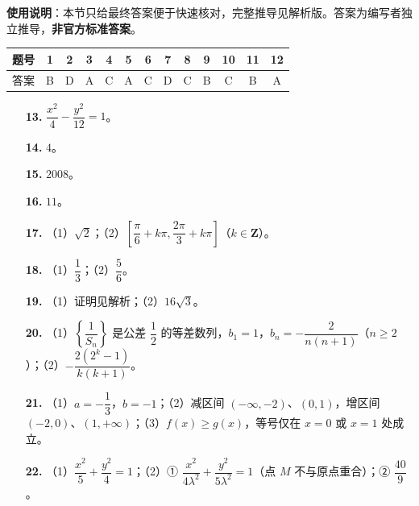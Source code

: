 
\begin{gknotice}
\textbf{使用说明}：本节只给最终答案便于快速核对，完整推导见解析版。答案为编写者独立推导，\textbf{非官方标准答案}。
\end{gknotice}

\begin{center}\begin{tabular}{ccccccccccccc}
\toprule
题号 & 1 & 2 & 3 & 4 & 5 & 6 & 7 & 8 & 9 & 10 & 11 & 12 \\
\midrule
答案 & B & D & A & C & A & C & D & C & B & C & B & A \\
\bottomrule
\end{tabular}\end{center}

\begin{itemize}[leftmargin=2.6em]
  \item[\textbf{13.}] $\dfrac{x^2}4-\dfrac{y^2}{12}=1$。
  \item[\textbf{14.}] $4$。
  \item[\textbf{15.}] $2008$。
  \item[\textbf{16.}] $11$。
\end{itemize}

\begin{itemize}[leftmargin=2.6em]
  \item[\textbf{17.}] （1）$\sqrt2$；（2）$\left[\dfrac{\pi}6+k\pi,\dfrac{2\pi}3+k\pi\right]$（$k\in\mathbf Z$）。
  \item[\textbf{18.}] （1）$\dfrac13$；（2）$\dfrac56$。
  \item[\textbf{19.}] （1）证明见解析；（2）$16\sqrt3$。
  \item[\textbf{20.}] （1）$\left\{\dfrac1{S_n}\right\}$ 是公差 $\dfrac12$ 的等差数列，$b_1=1$，$b_n=-\dfrac{2}{n(n+1)}$（$n\geqslant2$）；（2）$-\dfrac{2(2^k-1)}{k(k+1)}$。
  \item[\textbf{21.}] （1）$a=-\dfrac13$，$b=-1$；（2）减区间 $(-\infty,-2)$、$(0,1)$，增区间 $(-2,0)$、$(1,+\infty)$；（3）$f(x)\geqslant g(x)$，等号仅在 $x=0$ 或 $x=1$ 处成立。
  \item[\textbf{22.}] （1）$\dfrac{x^2}5+\dfrac{y^2}4=1$；（2）① $\dfrac{x^2}{4\lambda^2}+\dfrac{y^2}{5\lambda^2}=1$（点 $M$ 不与原点重合）；② $\dfrac{40}9$。
\end{itemize}
